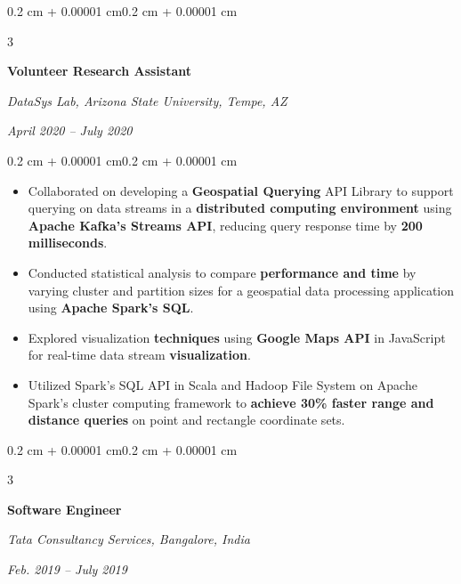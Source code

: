 \documentclass[10pt]{article}
\newenvironment{highlights}{
    \begin{itemize}[leftmargin=15pt, topsep=1pt, itemsep=1pt]
}{
    \end{itemize}
}
\newenvironment{onecolentry}{
    \begin{adjustwidth}{0.2 cm + 0.00001 cm}{0.2 cm + 0.00001 cm}
}{
    \end{adjustwidth}
}
\newenvironment{threecolentry}[3]{
    \onecolentry
    \def\firstColumn{#1}
    \def\secondColumn{#2}
    \def\thirdColumn{#3}
    \setcolumnwidth{6cm, 11.5cm, 5cm}
    \begin{paracol}{3}
    \firstColumn
}{
    \switchcolumn[1] \centering \secondColumn
    \switchcolumn[2] \raggedleft \thirdColumn
    \end{paracol}
    \endonecolentry
}
\begin{document}
        \vspace{0.3 cm}

        \begin{threecolentry}{
            \raggedright\textbf{Volunteer Research Assistant}
            }{
            \centering\textit{DataSys Lab, Arizona State University, Tempe, AZ}
            }{
            \raggedleft\textit{April 2020 -- July 2020}
            }
        \end{threecolentry}

        \vspace{0.10 cm}
        \begin{onecolentry}
            \begin{highlights}
                \item Collaborated on developing a \textbf{Geospatial Querying} API Library to support querying on data streams in a \textbf{distributed computing environment} using \textbf{Apache Kafka's Streams API}, reducing query response time by \textbf{200 milliseconds}.
                \item Conducted statistical analysis to compare \textbf{performance and time} by varying cluster and partition sizes for a geospatial data processing application using \textbf{Apache Spark's SQL}.
                \item Explored visualization \textbf{techniques} using \textbf{Google Maps API} in JavaScript for real-time data stream \textbf{visualization}.
                \item Utilized Spark's SQL API in Scala and Hadoop File System on Apache Spark's cluster computing framework to \textbf{achieve 30\% faster range and distance queries} on point and rectangle coordinate sets.
            \end{highlights}
        \end{onecolentry}

        \vspace{0.5 cm}

        \begin{threecolentry}{
            \raggedright\textbf{Software Engineer}
            }{
            \centering\textit{Tata Consultancy Services, Bangalore, India}
            }{
            \raggedleft\textit{Feb. 2019 -- July 2019}
            }
        \end{threecolentry}

        \vspace{0.5 cm}
\end{document}
